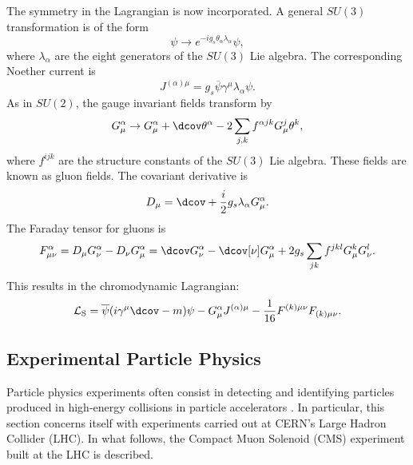 The symmetry in the Lagrangian is now incorporated. A general $SU(3)$ transformation is of the form
\begin{equation}
    \psi \rightarrow e^{-ig_s\theta_\alpha\lambda_\alpha} \psi,
\end{equation}
where $\lambda_\alpha$ are the eight generators of the $SU(3)$ Lie algebra. The corresponding Noether current is
\begin{equation}
    J^{(\alpha)\mu} = g_s \overline{\psi}\gamma^\mu\lambda_\alpha \psi.
\end{equation}
As in $SU(2)$, the gauge invariant fields transform by
\begin{equation}
    G_{\mu}^{\alpha} \rightarrow G_{\mu}^{\alpha} + \dcov \theta^\alpha - 2 \sum_{j,k} f^{\alpha jk}G_{\mu}^{j}\theta^{k},
\end{equation}
where $f^{ijk}$ are the structure constants of the $SU(3)$ Lie algebra. These fields are known as gluon fields. The covariant derivative is 
\begin{equation}
    D_\mu = \dcov +\frac{i}{2}g_s\lambda_{\alpha}G_{\mu}^{\alpha}.
\end{equation}
The Faraday tensor for gluons is
\begin{equation}
    F_{\mu\nu}^{\alpha} = D_\mu G_\nu^\alpha - D_\nu G_\mu ^\alpha = \dcov G_\nu^\alpha -\dcov[\nu] G_{\mu}^\alpha +2g_s\sum_{jk}f^{jkl}G_{\mu}^{k}G_\nu^{l}.
\end{equation}
This results in the chromodynamic Lagrangian:
\begin{equation}
    \mathcal{L}_\text{S} = \overline{\psi}(i\gamma^\mu\dcov-m)\psi-G_\mu^{\alpha}J^{(\alpha)\mu}-\frac{1}{16}F^{(k)\mu\nu}F_{(k)\mu\nu}.
\end{equation}


    
\subsection{Experimental Particle Physics}
Particle physics experiments often consist in detecting and identifying particles produced in high-energy collisions in particle accelerators \cite{thomson_modern_2013}. In particular, this section concerns itself with experiments carried out at CERN's Large Hadron Collider (LHC). In what follows, the Compact Muon Solenoid (CMS) experiment built at the LHC is described.

